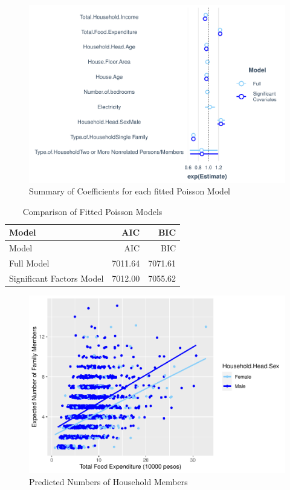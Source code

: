 \documentclass[
]{article}
\begin{document}
\begin{figure}[H]

{\centering \includegraphics[width=0.8\linewidth]{Group_01_Project2_demo_files/figure-latex/summary plot-1} 

}

\caption{Summary of Coefficients for each fitted Poisson Model}\label{fig:summary plot}
\end{figure}

\begin{longtable}[]{@{}lrr@{}}
\caption{Comparison of Fitted Poisson Models}\tabularnewline
\toprule
Model & AIC & BIC \\
\midrule
\endfirsthead
\toprule
Model & AIC & BIC \\
\midrule
\endhead
Full Model & 7011.64 & 7071.61 \\
Significant Factors Model & 7012.00 & 7055.62 \\
\bottomrule
\end{longtable}

\begin{figure}[H]

{\centering \includegraphics[width=0.8\linewidth]{Group_01_Project2_demo_files/figure-latex/pred plot-1} 

}

\caption{Predicted Numbers of Household Members}\label{fig:pred plot}
\end{figure}
\end{document}
